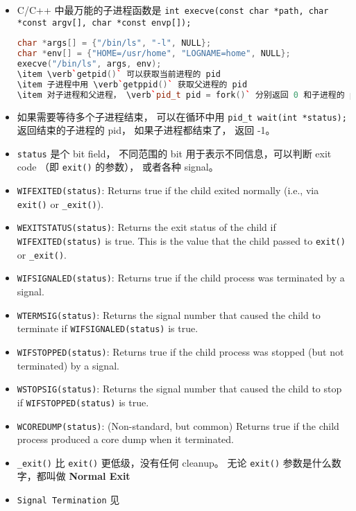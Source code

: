 \begin{itemize}
\item C/C++ 中最万能的子进程函数是 \verb`int execve(const char *path, char *const argv[], char *const envp[]);`
\begin{lstlisting}[language=cpp]
char *args[] = {"/bin/ls", "-l", NULL};
char *env[] = {"HOME=/usr/home", "LOGNAME=home", NULL};
execve("/bin/ls", args, env);
\item \verb`getpid()` 可以获取当前进程的 pid
\item 子进程中用 \verb`getppid()` 获取父进程的 pid
\item 对子进程和父进程， \verb`pid_t pid = fork()` 分别返回 0 和子进程的 pid。
\end{lstlisting}
\item 如果需要等待多个子进程结束， 可以在循环中用 \verb`pid_t wait(int *status);` 返回结束的子进程的 pid， 如果子进程都结束了， 返回 -1。
\item \verb`status` 是个 bit field， 不同范围的 bit 用于表示不同信息，可以判断 exit code （即 \verb`exit()` 的参数）， 或者各种 signal。
\item \verb`WIFEXITED(status)`: Returns true if the child exited normally (i.e., via \verb`exit()` or \verb`_exit()`).
\item \verb`WEXITSTATUS(status)`: Returns the exit status of the child if \verb`WIFEXITED(status)` is true. This is the value that the child passed to \verb`exit()` or \verb`_exit()`.
\item \verb`WIFSIGNALED(status)`: Returns true if the child process was terminated by a signal.
\item \verb`WTERMSIG(status)`: Returns the signal number that caused the child to terminate if \verb`WIFSIGNALED(status)` is true.
\item \verb`WIFSTOPPED(status)`: Returns true if the child process was stopped (but not terminated) by a signal.
\item \verb`WSTOPSIG(status)`: Returns the signal number that caused the child to stop if \verb`WIFSTOPPED(status)` is true.
\item \verb`WCOREDUMP(status)`: (Non-standard, but common) Returns true if the child process produced a core dump when it terminated.
\item \verb`_exit()` 比 \verb`exit()` 更低级，没有任何 cleanup。 无论 \verb`exit()` 参数是什么数字，都叫做 \textbf{Normal Exit}
\item \verb`Signal Termination` 见 
\end{itemize}

